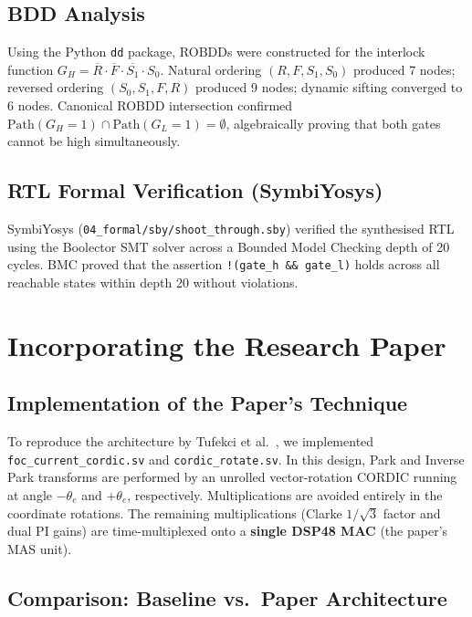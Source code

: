 \documentclass[11pt,a4paper]{article}
\begin{document}
\subsection{BDD Analysis}
Using the Python \texttt{dd} package, ROBDDs were constructed for the interlock function $G_H = \overline{R} \cdot \overline{F} \cdot \overline{S_1} \cdot S_0$. Natural ordering $(R, F, S_1, S_0)$ produced 7 nodes; reversed ordering $(S_0, S_1, F, R)$ produced 9 nodes; dynamic sifting converged to 6 nodes. Canonical ROBDD intersection confirmed $\text{Path}(G_H = 1) \cap \text{Path}(G_L = 1) = \emptyset$, algebraically proving that both gates cannot be high simultaneously.

\subsection{RTL Formal Verification (SymbiYosys)}
SymbiYosys (\texttt{04\_formal/sby/shoot\_through.sby}) verified the synthesised RTL using the Boolector SMT solver across a Bounded Model Checking depth of 20 cycles. BMC proved that the assertion \texttt{!(gate\_h \&\& gate\_l)} holds across all reachable states within depth 20 without violations.

\section{Incorporating the Research Paper}
\label{sec:paper}

\subsection{Implementation of the Paper's Technique}
To reproduce the architecture by Tufekci et al.~\cite{tufekci2020}, we implemented \texttt{foc\_current\_cordic.sv} and \texttt{cordic\_rotate.sv}. In this design, Park and Inverse Park transforms are performed by an unrolled vector-rotation CORDIC running at angle $-\theta_e$ and $+\theta_e$, respectively. Multiplications are avoided entirely in the coordinate rotations. The remaining multiplications (Clarke $1/\sqrt{3}$ factor and dual PI gains) are time-multiplexed onto a \textbf{single DSP48 MAC} (the paper's MAS unit).

\subsection{Comparison: Baseline vs.\ Paper Architecture}
\end{document}
